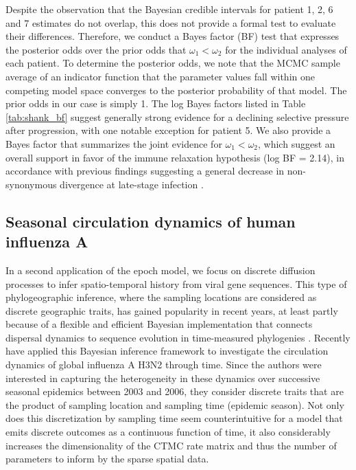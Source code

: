 Despite the observation that the Bayesian credible intervals for patient 1, 2, 6 and 7 estimates do not overlap, this does not provide a formal test to evaluate their differences.
Therefore, we conduct a Bayes factor (BF) test \citep{Suchard2005} that expresses the posterior odds over the prior odds that $\omega_{1} < \omega_{2}$ for the individual analyses of each patient.
To determine the posterior odds, we note that the MCMC sample average of an indicator function that the parameter values fall within one competing model space converges to the posterior probability of that model.
The prior odds in our case is simply 1.
The log Bayes factors listed in Table \ref{tab:shank_bf} suggest generally strong evidence for a declining selective pressure after progression, with one notable exception for patient 5.
We also provide a Bayes factor that summarizes the joint evidence for $\omega_{1} < \omega_{2}$, which suggest an overall support in favor of the immune relaxation hypothesis (log BF = 2.14), in accordance with previous findings suggesting a general decrease in non-synonymous divergence at late-stage infection \citep{williamson2005, Lemey2007}.

\subsection{Seasonal circulation dynamics of human influenza A}

In a second application of the epoch model, we focus on discrete diffusion processes to infer spatio-temporal history from viral gene sequences.
This type of phylogeographic inference, where the sampling locations are considered as discrete geographic traits, has gained popularity in recent years, at least partly because of a flexible and efficient Bayesian implementation that connects dispersal dynamics to sequence evolution in time-measured phylogenies \citep{Lemey2009}.
Recently \citet{Bahl2011} have applied this Bayesian inference framework to investigate the circulation dynamics of global influenza A H3N2 through time.
Since the authors were interested in capturing the heterogeneity in these dynamics over successive seasonal epidemics between 2003 and 2006, they consider discrete traits that are the product of sampling location and sampling time (epidemic season).
Not only does this discretization by sampling time seem counterintuitive for a model that emits discrete outcomes as a continuous function of time, it also considerably increases the dimensionality of the CTMC rate matrix and thus the number of parameters to inform by the sparse spatial data.

